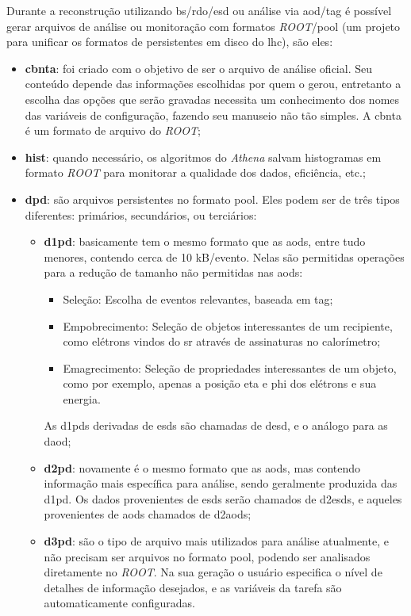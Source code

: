 Durante a reconstrução utilizando \gls{bs}/\gls{rdo}/\gls{esd} ou análise via
\gls{aod}/\gls{tag} é possível gerar arquivos de análise ou monitoração com formatos 
\emph{ROOT}/\gls{pool} (um projeto para unificar os formatos de
persistentes em disco do \gls{lhc}), são eles:


\begin{itemize}
\item \textbf{\gls{cbnta}}: foi criado com o objetivo de ser o arquivo de
análise oficial. Seu conteúdo depende das informações escolhidas por quem o
gerou, entretanto a escolha das opções que serão gravadas necessita um
conhecimento dos nomes das variáveis de configuração, fazendo seu manuseio não
tão simples. A \gls{cbnta} é um formato de arquivo do \emph{ROOT};
\item \textbf{\gls{hist}}: quando necessário, os algoritmos do \emph{Athena} salvam
histogramas em formato \emph{ROOT} para monitorar a qualidade dos dados, eficiência, etc.;
\item \textbf{\gls{dpd}}: são arquivos persistentes no formato \gls{pool}. Eles
podem ser de três tipos diferentes: primários, secundários, ou terciários:
\begin{itemize}
\item \textbf{\gls{d1pd}}: basicamente tem o mesmo formato que as \glspl{aod},
entre tudo menores, contendo cerca de 10 kB/evento. Nelas são permitidas operações para
a redução de tamanho não permitidas nas \glspl{aod}:
\begin{itemize}
\item Seleção: Escolha de eventos relevantes, baseada em \gls{tag};
\item Empobrecimento: Seleção de objetos interessantes de um recipiente,
como elétrons vindos do \glsdesc{sr} através de assinaturas no
calorímetro;
\item Emagrecimento: Seleção de propriedades interessantes de um objeto, como
por exemplo, apenas a posição \gls{eta} e \gls{phi} dos elétrons e sua energia.
\end{itemize}
As \glspl{d1pd} derivadas de \glspl{esd} são chamadas de \gls{desd}, e o
análogo para as \gls{daod};
\item \textbf{\gls{d2pd}}: novamente é o mesmo formato que as \glspl{aod}, mas
contendo informação mais específica para análise, sendo geralmente produzida das
\gls{d1pd}. Os dados provenientes de \glspl{esd} serão chamados de
\glspl{d2esd}, e aqueles provenientes de \glspl{aod} chamados de
\glspl{d2aod};
\item \textbf{\gls{d3pd}}: são o tipo de arquivo mais utilizados para análise
atualmente, e não precisam ser arquivos no formato \gls{pool}, podendo ser
analisados diretamente no \emph{ROOT}. Na sua geração o
usuário especifica o nível de detalhes de informação desejados, e as variáveis
da tarefa são automaticamente configuradas.
\end{itemize}
\end{itemize}

